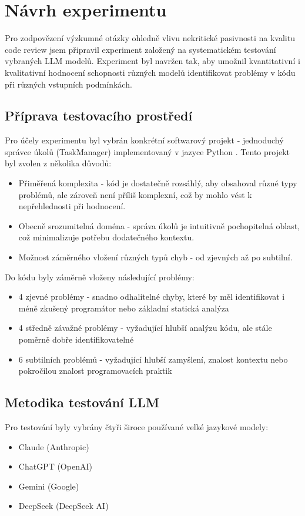 \documentclass[12pt, a4paper]{article}
\begin{document}
\section{Návrh experimentu}

Pro zodpovězení výzkumné otázky ohledně vlivu nekritické pasivnosti na kvalitu code review jsem připravil experiment založený na systematickém testování vybraných LLM modelů. Experiment byl navržen tak, aby umožnil kvantitativní i kvalitativní hodnocení schopnosti různých modelů identifikovat problémy v kódu při různých vstupních podmínkách.

\subsection{Příprava testovacího prostředí}
Pro účely experimentu byl vybrán konkrétní softwarový projekt - jednoduchý správce úkolů (TaskManager) implementovaný v jazyce Python \cite{pospisil2025}. Tento projekt byl zvolen z několika důvodů:

\begin{itemize}
  \item Přiměřená komplexita - kód je dostatečně rozsáhlý, aby obsahoval různé typy problémů, ale zároveň není příliš komplexní, což by mohlo vést k nepřehlednosti při hodnocení.
  \item Obecně srozumitelná doména - správa úkolů je intuitivně pochopitelná oblast, což minimalizuje potřebu dodatečného kontextu.
  \item Možnost záměrného vložení různých typů chyb - od zjevných až po subtilní.
\end{itemize}

Do kódu byly záměrně vloženy následující problémy:
\begin{itemize}
  \item 4 zjevné problémy - snadno odhalitelné chyby, které by měl identifikovat i méně zkušený programátor nebo základní statická analýza
  \item 4 středně závažné problémy - vyžadující hlubší analýzu kódu, ale stále poměrně dobře identifikovatelné
  \item 6 subtilních problémů - vyžadující hlubší zamyšlení, znalost kontextu nebo pokročilou znalost programovacích praktik
\end{itemize}

\subsection{Metodika testování LLM}
Pro testování byly vybrány čtyři široce používané velké jazykové modely:
\begin{itemize}
  \item Claude (Anthropic)
  \item ChatGPT (OpenAI)
  \item Gemini (Google)
  \item DeepSeek (DeepSeek AI)
\end{itemize}
\end{document}
